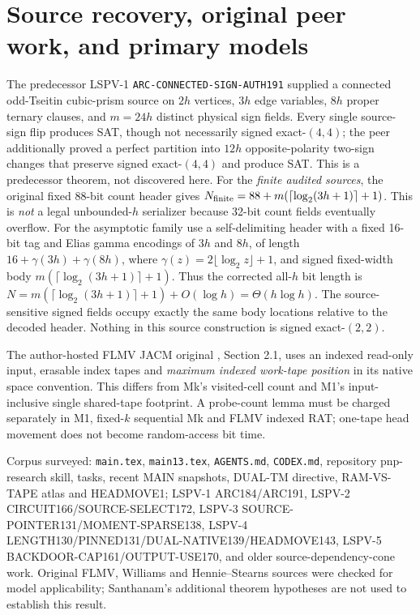 \documentclass[11pt]{article}
\begin{document}
\section{Source recovery, original peer work, and primary models}
The predecessor LSPV-1 \texttt{ARC-CONNECTED-SIGN-AUTH191} supplied a connected odd-Tseitin cubic-prism source on $2h$ vertices, $3h$ edge variables, $8h$ proper ternary clauses, and $m=24h$ distinct physical sign fields. Every single source-sign flip produces SAT, though not necessarily signed exact-$(4,4)$; the peer additionally proved a perfect partition into $12h$ opposite-polarity two-sign changes that preserve signed exact-$(4,4)$ and produce SAT. This is a predecessor theorem, not discovered here. For the \emph{finite audited sources}, the original fixed 88-bit count header gives $N_{\rm finite}=88+m(\lceil\log_2(3h+1)\rceil+1)$. This is \emph{not} a legal unbounded-$h$ serializer because 32-bit count fields eventually overflow. For the asymptotic family use a self-delimiting header with a fixed 16-bit tag and Elias gamma encodings of $3h$ and $8h$, of length $16+\gamma(3h)+\gamma(8h)$, where $\gamma(z)=2\lfloor\log_2z\rfloor+1$, and signed fixed-width body $m(\lceil\log_2(3h+1)\rceil+1)$. Thus the corrected all-$h$ bit length is $N=m(\lceil\log_2(3h+1)\rceil+1)+O(\log h)=\Theta(h\log h)$. The source-sensitive signed fields occupy exactly the same body locations relative to the decoded header. Nothing in this source construction is signed exact-$(2,2)$.

The author-hosted FLMV JACM original \cite{flmv}, Section 2.1, uses an indexed read-only input, erasable index tapes and \emph{maximum indexed work-tape position} in its native space convention. This differs from Mk's visited-cell count and M1's input-inclusive single shared-tape footprint. A probe-count lemma must be charged separately in M1, fixed-$k$ sequential Mk and FLMV indexed RAT; one-tape head movement does not become random-access bit time.

Corpus surveyed: \texttt{main.tex}, \texttt{main13.tex}, \texttt{AGENTS.md}, \texttt{CODEX.md}, repository pnp-research skill, tasks, recent MAIN snapshots, DUAL-TM directive, RAM-VS-TAPE atlas and HEADMOVE1; LSPV-1 ARC184/ARC191, LSPV-2 CIRCUIT166/SOURCE-SELECT172, LSPV-3 SOURCE-POINTER131/MOMENT-SPARSE138, LSPV-4 LENGTH130/PINNED131/DUAL-NATIVE139/HEADMOVE143, LSPV-5 BACKDOOR-CAP161/OUTPUT-USE170, and older source-dependency-cone work. Original FLMV, Williams and Hennie--Stearns sources were checked for model applicability; Santhanam's additional theorem hypotheses are not used to establish this result.
\end{document}
